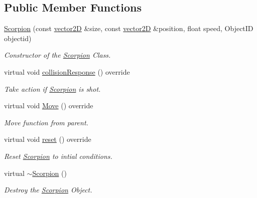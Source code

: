\subsection*{Public Member Functions}
\begin{DoxyCompactItemize}
\item 
\mbox{\hyperlink{class_scorpion_a0046bcdb8f478bf54032acba20ba44e5}{Scorpion}} (const \mbox{\hyperlink{classvector2_d}{vector2D}} \&size, const \mbox{\hyperlink{classvector2_d}{vector2D}} \&position, float speed, Object\+ID objectid)
\begin{DoxyCompactList}\small\item\em Constructor of the \mbox{\hyperlink{class_scorpion}{Scorpion}} Class. \end{DoxyCompactList}\item 
\mbox{\label{class_scorpion_a4f5a88977dd4dd19dd5c61a8114f43a5}} 
virtual void \mbox{\hyperlink{class_scorpion_a4f5a88977dd4dd19dd5c61a8114f43a5}{collision\+Response}} () override
\begin{DoxyCompactList}\small\item\em Take action if \mbox{\hyperlink{class_scorpion}{Scorpion}} is shot. \end{DoxyCompactList}\item 
\mbox{\label{class_scorpion_acf8d302a008882781a701df5854d2c75}} 
virtual void \mbox{\hyperlink{class_scorpion_acf8d302a008882781a701df5854d2c75}{Move}} () override
\begin{DoxyCompactList}\small\item\em Move function from parent. \end{DoxyCompactList}\item 
\mbox{\label{class_scorpion_a9de22ed90e1a48e06291317fbe558e41}} 
virtual void \mbox{\hyperlink{class_scorpion_a9de22ed90e1a48e06291317fbe558e41}{reset}} () override
\begin{DoxyCompactList}\small\item\em Reset \mbox{\hyperlink{class_scorpion}{Scorpion}} to intial conditions. \end{DoxyCompactList}\item 
\mbox{\label{class_scorpion_af44080430b68b2f9ea07b3cc9df03453}} 
virtual \mbox{\hyperlink{class_scorpion_af44080430b68b2f9ea07b3cc9df03453}{$\sim$\+Scorpion}} ()
\begin{DoxyCompactList}\small\item\em Destroy the \mbox{\hyperlink{class_scorpion}{Scorpion}} Object. \end{DoxyCompactList}\end{DoxyCompactItemize}
